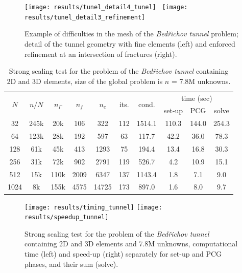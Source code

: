 \begin{figure}[ptbh]
\begin{center}
\texttt{[image: results/tunel\_detail4\_tunel]} \ 
\texttt{[image: results/tunel\_detail3\_refinement]}
\end{center}
\caption{\label{fig:tunel_3}
Example of difficulties in the mesh of the \emph{Bed\v{r}ichov
tunnel} problem; detail of the tunnel geometry with fine elements (left) and
enforced refinement at an intersection of fractures (right).}
\end{figure}

\begin{table}[pth]
\begin{center}
\begin{tabular}
[c]{|cc|ccc|cc|ccc|}\hline
\multirow{2}{*}{$N$} & \multirow{2}{*}{$n/N$} & \multirow{2}{*}{$n_{\Gamma}$} & \multirow{2}{*}{$n_f$} & \multirow{2}{*}{$n_c$} & 
\multirow{2}{*}{its.} & \multirow{2}{*}{cond.} & \multicolumn{3}{c|}{time (sec)} \\
&  &  &  &  &  &  & set-up & PCG & solve \\\hline 
32 & 245k & 20k & 106 & 322     & 112 & 1514.1 & 110.3 & 144.0 & 254.3\\
64 & 123k & 28k & 192 & 597     & 63  & 117.7  & 42.2  & 36.0  & 78.3\\
128 & 61k & 45k & 413 & 1293    & 75  & 194.4  & 13.4  & 16.8  & 30.3\\
256 & 31k & 72k & 902 & 2791    & 119 & 526.7  & 4.2   & 10.9  & 15.1\\
512 & 15k & 110k & 2009 & 6347  & 137 & 1143.4 & 1.8   & 7.1   & 9.0\\
1024 & 8k & 155k & 4575 & 14725 & 173 & 897.0  & 1.6   & 8.0   & 9.7\\\hline
\end{tabular}
\end{center}
\caption{\label{tab:tunnel_strong_scaling}
Strong scaling test for the problem of the \emph{Bed\v{r}ichov
tunnel} containing 2D and 3D elements, size of the global problem is $n$ = 7.8M unknowns.}
\end{table}

\begin{figure}[ptbh]
\begin{center}
\texttt{[image: results/timing\_tunnel]} 
\texttt{[image: results/speedup\_tunnel]}
\end{center}
\caption{\label{fig:timing_tunnel}
Strong scaling test for the problem of the \emph{Bed\v{r}ichov
tunnel} containing 2D and 3D elements and 7.8M unknowns, computational time
(left) and speed-up (right) separately for set-up and PCG phases, and their
sum (solve).}
\end{figure}

